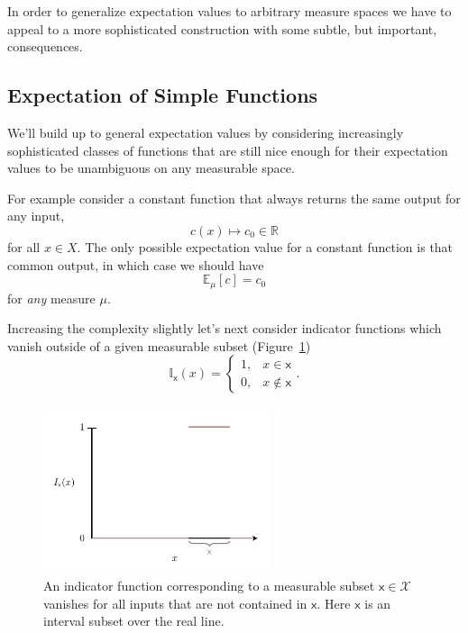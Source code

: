 \documentclass[
  letterpaper,
  DIV=11,
  numbers=noendperiod]{scrartcl}
\begin{document}
In order to generalize expectation values to arbitrary measure spaces we
have to appeal to a more sophisticated construction with some subtle,
but important, consequences.

\hypertarget{expectation-of-simple-functions}{%
\subsection{Expectation of Simple
Functions}\label{expectation-of-simple-functions}}

We'll build up to general expectation values by considering increasingly
sophisticated classes of functions that are still nice enough for their
expectation values to be unambiguous on any measurable space.

For example consider a constant function that always returns the same
output for any input, \[
c(x) \mapsto c_{0} \in \mathbb{R}
\] for all \(x \in X\). The only possible expectation value for a
constant function is that common output, in which case we should have \[
\mathbb{E}_{\mu}[c] = c_{0}
\] for \emph{any} measure \(\mu\).

Increasing the complexity slightly let's next consider indicator
functions which vanish outside of a given measurable subset
(Figure~\ref{fig-indicator}) \[
\mathbb{I}_{\mathsf{x}} (x) =
\left\{
\begin{array}{rr}
1, & x \in \mathsf{x} \\
0, & x \notin \mathsf{x}
\end{array}
\right. .
\]

\begin{figure}

{\centering \includegraphics[width=0.6\textwidth,height=\textheight]{figures/indicator_function/indicator_function.pdf}

}

\caption{\label{fig-indicator}An indicator function corresponding to a
measurable subset \(\mathsf{x} \in \mathcal{X}\) vanishes for all inputs
that are not contained in \(\mathsf{x}\). Here \(\mathsf{x}\) is an
interval subset over the real line.}

\end{figure}
\end{document}
